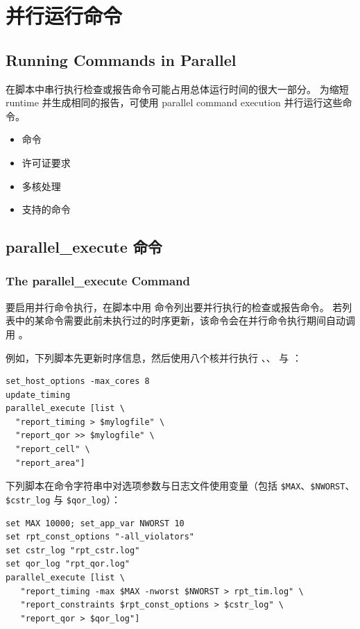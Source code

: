 \section{并行运行命令}
\subsection*{Running Commands in Parallel}

在脚本中串行执行检查或报告命令可能占用总体运行时间的很大一部分。
为缩短 runtime 并生成相同的报告，可使用 parallel command execution 并行运行这些命令。
\begin{itemize}
  \item {} 命令
  \item 许可证要求
  \item 多核处理
  \item 支持的命令
\end{itemize}

\subsection{parallel\_execute 命令}
\subsubsection*{The parallel\_execute Command}

要启用并行命令执行，在脚本中用  命令列出要并行执行的检查或报告命令。
若列表中的某命令需要此前未执行过的时序更新，该命令会在并行命令执行期间自动调用 。

例如，下列脚本先更新时序信息，然后使用八个核并行执行 、、 与 ：
\begin{lstlisting}
set_host_options -max_cores 8
update_timing
parallel_execute [list \
  "report_timing > $mylogfile" \
  "report_qor >> $mylogfile" \
  "report_cell" \
  "report_area"]
\end{lstlisting}

下列脚本在命令字符串中对选项参数与日志文件使用变量（包括 \texttt{\$MAX}、\texttt{\$NWORST}、\texttt{\$cstr\_log} 与 \texttt{\$qor\_log}）：
\begin{lstlisting}
set MAX 10000; set_app_var NWORST 10
set rpt_const_options "-all_violators"
set cstr_log "rpt_cstr.log"
set qor_log "rpt_qor.log"
parallel_execute [list \
   "report_timing -max $MAX -nworst $NWORST > rpt_tim.log" \
   "report_constraints $rpt_const_options > $cstr_log" \
   "report_qor > $qor_log"]
\end{lstlisting}


